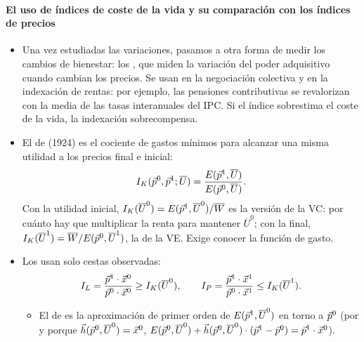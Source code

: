 \documentclass[11pt]{article}
\begin{document}
\paragraph{El uso de índices de coste de la vida y su comparación con los índices de precios}

\begin{itemize}
\item Una vez estudiadas las variaciones, pasamos a otra forma de medir los cambios de bienestar: los , que miden la variación del poder adquisitivo cuando cambian los precios. Se usan en la negociación colectiva y en la indexación de rentas: por ejemplo, las pensiones contributivas se revalorizan con la media de las tasas interanuales del IPC\nocite{BOE2015LGSS}. Si el índice sobrestima el coste de la vida, la indexación sobrecompensa.
\item El  de  (1924) es el cociente de gastos mínimos para alcanzar una misma utilidad a los precios final e inicial\nocite{Konus1939Problem}:
  \begin{equation}
  I_K(\vec{p}^0,\vec{p}^1;\overline{U})=\frac{E(\vec{p}^1,\overline{U})}{E(\vec{p}^0,\overline{U})}. \label{eq:konus}
  \end{equation}
  Con la utilidad inicial, $I_K(\overline{U}^0)=E(\vec{p}^1,\overline{U}^0)/\overline{W}$ es la versión de la VC: por cuánto hay que multiplicar la renta para mantener $\overline{U}^0$; con la final, $I_K(\overline{U}^1)=\overline{W}/E(\vec{p}^0,\overline{U}^1)$, la de la VE. Exige conocer la función de gasto.
\item Los  usan solo cestas observadas\nocite{Laspeyres1871Berechnung,Paasche1874Preisentwicklung}:
  \begin{equation}
  I_L=\frac{\vec{p}^1\cdot\vec{x}^0}{\vec{p}^0\cdot\vec{x}^0}\geq I_K(\overline{U}^0),\qquad I_P=\frac{\vec{p}^1\cdot\vec{x}^1}{\vec{p}^0\cdot\vec{x}^1}\leq I_K(\overline{U}^1). \label{eq:laspeyres-paasche}
  \end{equation}
  \begin{itemize}
  \item El de \emph{} es la aproximación de primer orden de $E(\vec{p}^1,\overline{U}^0)$ en torno a $\vec{p}^0$ (por  y porque $\vec{h}(\vec{p}^0,\overline{U}^0)=\vec{x}^0$, $E(\vec{p}^0,\overline{U}^0)+\vec{h}(\vec{p}^0,\overline{U}^0)\cdot(\vec{p}^1-\vec{p}^0)=\vec{p}^1\cdot\vec{x}^0$).
    \begin{itemize}

\end{itemize}
\end{itemize}
\end{itemize}
\end{document}
